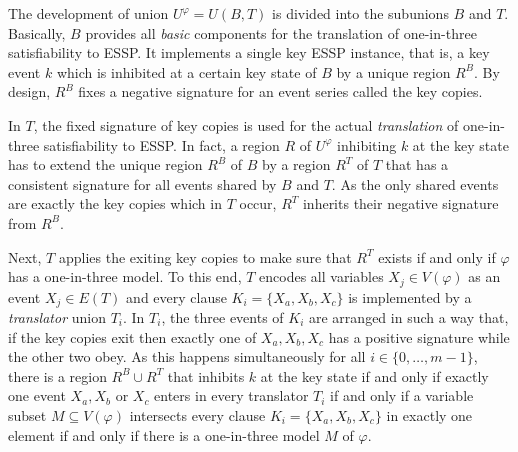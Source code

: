 \documentclass[english]{lipics_hacked}
\begin{document}
The development of union $U^\varphi= U(B, T)$ is divided into the subunions $B$ and $T$.
Basically, $B$ provides all \emph{basic} components for the translation of one-in-three satisfiability to ESSP.
It implements a single key ESSP instance, that is, a key event $k$ which is inhibited at a certain key state of $B$ by a unique region $R^B$.
By design, $R^B$ fixes a negative signature for an event series called the key copies.

In $T$, the fixed signature of key copies is used for the actual \emph{translation} of one-in-three satisfiability to ESSP.
In fact, a region $R$ of $U^\varphi$ inhibiting $k$ at the key state has to extend the unique region $R^B$ of $B$ by a region $R^T$ of $T$ that has a consistent signature for all events shared by $B$ and $T$.
As the only shared events are exactly the key copies which in $T$ occur, $R^T$ inherits their negative signature from $R^B$.

Next, $T$ applies the exiting key copies to make sure that $R^T$ exists if and only if $\varphi$ has a one-in-three model.
To this end, $T$ encodes all variables $X_j \in V(\varphi)$ as an event $X_j \in E(T)$ and every clause $K_i = \{X_a,X_b,X_c\}$ is implemented by a \emph{translator} union $T_i$.
In $T_i$, the three events of $K_i$ are arranged in such a way that, if the key copies exit then exactly one of $X_a,X_b,X_c$ has a positive signature while the other two obey.
As this happens simultaneously for all $i\in \{0, \dots, m-1\}$, there is a region $R^B\cup R^T$ that inhibits $k$ at the key state if and only if exactly one event $X_a,X_b$ or $X_c$ enters in every translator $T_i$ if and only if a variable subset $M \subseteq V(\varphi)$ intersects every clause $K_i = \{X_a,X_b,X_c\}$ in exactly one element if and only if there is a one-in-three model $M$ of $\varphi$.
\end{document}
